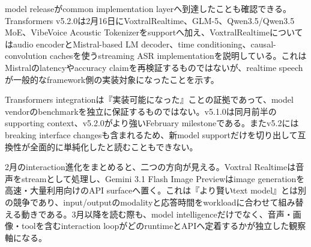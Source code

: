 model releaseがcommon implementation layerへ到達したことも確認できる。Transformers v5.2.0は2月16日にVoxtralRealtime、GLM-5、Qwen3.5/Qwen3.5 MoE、VibeVoice Acoustic Tokenizerをsupportへ加え、VoxtralRealtimeについてはaudio encoderとMistral-based LM decoder、time conditioning、causal-convolution cachesを使うstreaming ASR implementationを説明している。これはMistralのlatencyやaccuracy claimを再検証するものではないが、realtime speechが一般的なframework側の実装対象になったことを示す。\autocite{src-0bd04783f97b,src-a43d64987293}


\begin{claimboundary}
Transformers integrationは『実装可能になった』ことの証拠であって、model vendorのbenchmarkを独立に保証するものではない。v5.1.0は同月前半のsupporting context、v5.2.0がより強いFebruary milestoneである。またv5.2にはbreaking interface changesも含まれるため、新model supportだけを切り出して互換性が全面的に単純化したと読むこともできない。\autocite{src-0bd04783f97b,src-a43d64987293}
\end{claimboundary}

2月のinteraction進化をまとめると、二つの方向が見える。Voxtral Realtimeは音声をstreamとして処理し、Gemini 3.1 Flash Image Previewはimage generationを高速・大量利用向けのAPI surfaceへ置く。これは『より賢いtext model』とは別の競争であり、input/outputのmodalityと応答時間をworkloadに合わせて組み替える動きである。3月以降を読む際も、model intelligenceだけでなく、音声・画像・toolを含むinteraction loopがどのruntimeとAPIへ定着するかが独立した観察軸になる。\autocite{src-a24fd97eb3d0,src-a43d64987293,src-d8b7c1c36830}
